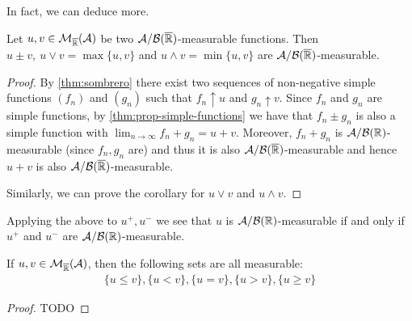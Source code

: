 In fact, we can deduce more.

\begin{cor}
	\label{cor:properties-measurable}
	Let $u, v \in \mathcal{M}_{\overline{\mathbb{R}}}(\mathcal{A})$ be two $\mathcal{A}/\mathcal{B}({\overline{\mathbb{R}}})$-measurable functions. Then $u \pm v,\ u \lor v = \max\{u, v\}$ and $u \land v = \min\{u, v\}$ are $\mathcal{A}/\mathcal{B}({\overline{\mathbb{R}}})$-measurable.
\end{cor}

\begin{proof}
	By \autoref{thm:sombrero} there exist two sequences of non-negative simple functions $(f_n)$ and $(g_n)$ such that $f_n \uparrow u$ and $g_n \uparrow v$. Since $f_n$ and $g_n$ are simple functions, by \autoref{thm:prop-simple-functions} we have that $f_n \pm g_n$ is also a simple function with $\lim_{n\to \infty} f_n + g_n = u + v$. Moreover, $f_n + g_n$ is $\mathcal{A}/\mathcal{B}(\mathbb{R})$-measurable (since $f_n, g_n$ are) and thus it is also $\mathcal{A}/\mathcal{B}({\overline{\mathbb{R}}})$-measurable and hence $u+v$ is also $\mathcal{A}/\mathcal{B}({\overline{\mathbb{R}}})$-measurable.
	
	Similarly, we can prove the corollary for $u\lor v$ and $u \land v$.
\end{proof}

\begin{remark}
	Applying the above to $u^+, u^-$ we see that $u$ is $\mathcal{A}/\mathcal{B}(\mathbb{R})$-measurable if and only if $u^+$ and $u^-$ are $\mathcal{A}/\mathcal{B}(\mathbb{R})$-measurable.
\end{remark}

\begin{cor}
	If $u, v \in \mathcal{M}_{\overline{\mathbb{R}}}(\mathcal{A})$, then the following sets are all measurable:
	\begin{align*}
		\{u \leq v\}, \{u < v\}, \{u = v\}, \{u > v\}, \{u \geq v\}
	\end{align*}
\end{cor}

\begin{proof}
	TODO
\end{proof}
